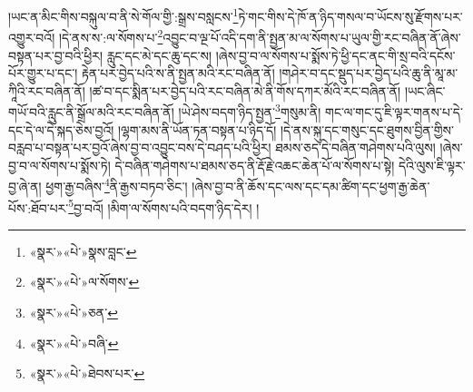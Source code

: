 །ཡང་ན་མིང་གིས་བསྐུལ་བ་ནི་སེ་གོལ་གྱི་:སྒྲས་བསླངས་\footnote{«སྣར་»«པེ་»སྣས་བླང་}ཏེ་གང་གིས་དེ་ཁོ་ན་ཉིད་གསལ་བ་ཡོངས་སུ་རྫོགས་པར་འགྱུར་བའོ། །དེ་ནས་ས་:ལ་སོགས་པ་\footnote{«སྣར་»«པེ་»ལ་སོགས་}འབྱུང་བ་ལྔ་པོ་འདི་དག་ནི་སྤྱན་མ་ལ་སོགས་པ་ཡུལ་གྱི་རང་བཞིན་ནོ་ཞེས་བསྟན་པར་བྱ་བའི་ཕྱིར། རླུང་དང་མེ་དང་ཆུ་དང་ས། །ཞེས་བྱ་བ་ལ་སོགས་པ་སྨོས་ཏེ་ཕྱི་དང་ནང་གི་སྲ་བའི་དངོས་པོར་གྱུར་པ་དང་། རྟེན་པར་བྱེད་པའི་ས་ནི་སྤྱན་མའི་རང་བཞིན་ནོ། །གཤེར་བ་དང་སྡུད་པར་བྱེད་པའི་ཆུ་ནི་མཱ་མ་ཀཱིའི་རང་བཞིན་ནོ། །ཚ་བ་དང་སྨིན་པར་བྱེད་པའི་རང་བཞིན་མེ་ནི་གོས་དཀར་མོའི་རང་བཞིན་ནོ། །ཡང་ཞིང་གཡོ་བའི་རླུང་ནི་སྒྲོལ་མའི་རང་བཞིན་ནོ། །ཡེ་ཤེས་བདག་ཉིད་སྤྱན་\footnote{«སྣར་»«པེ་»ཅན་}གསུམ་ནི། གང་ལ་གང་དུ་ཇི་ལྟར་གནས་པ་དེ་དང་དེ་ལ་དེ་སྐད་ཅེས་བྱའོ། །ལྷག་མས་ནི་ཡོན་ཏན་བསྟན་པ་ཉིད་དོ། །དེ་ནས་སྐུ་དང་གསུང་དང་ཐུགས་བྱིན་གྱིས་བརླབ་པ་བསྟན་པར་བྱའོ་ཞེས་བྱ་བ་འབྱུང་བས་དེ་བཤད་པའི་ཕྱིར། ཐམས་ཅད་དེ་བཞིན་གཤེགས་པའི་ལུས། །ཞེས་བྱ་བ་ལ་སོགས་པ་སྨོས་ཏེ། དེ་བཞིན་གཤེགས་པ་ཐམས་ཅད་ནི་རྡོ་རྗེ་འཆང་ཆེན་པོ་ལ་སོགས་པ་སྟེ། དེའི་ལུས་ཇི་ལྟར་བྱ་ཞེ་ན། ཕྱག་རྒྱ་བཞིས་\footnote{«སྣར་»«པེ་»བཞི་}ནི་རྒྱས་བཏབ་ཅིང་། །ཞེས་བྱ་བ་ནི་ཆོས་དང་ལས་དང་དམ་ཚིག་དང་ཕྱག་རྒྱ་ཆེན་པོས་:ཐོབ་པར་\footnote{«སྣར་»«པེ་»ཐེབས་པར་}བྱ་བའོ། །མིག་ལ་སོགས་པའི་བདག་ཉིད་དེར། །

